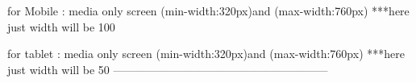 
for Mobile : media only screen (min-width:320px)and (max-width:760px){
    ***here just width will be 100%
}

for tablet : media only screen (min-width:320px)and (max-width:760px){
    ***here just width will be 50%
}
---------------------------------------------------------